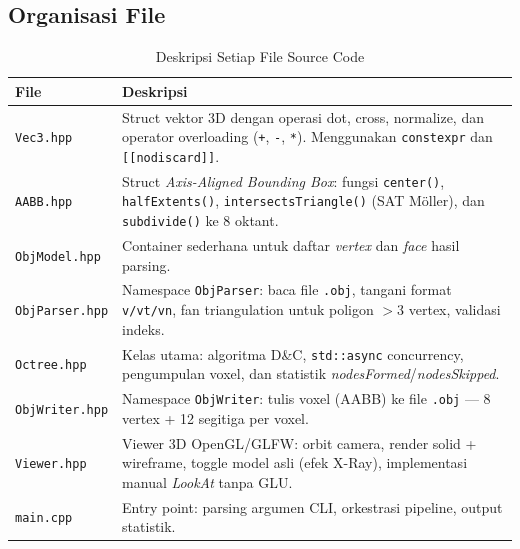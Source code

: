 \documentclass[12pt, a4paper]{report}
\begin{document}
\subsection{Organisasi File}

\begin{table}[H]
  \centering
  \caption{Deskripsi Setiap File Source Code}
  \label{tab:files}
  \begin{tabularx}{\textwidth}{lX}
    \toprule
    \textbf{File} & \textbf{Deskripsi} \\
    \midrule
    \texttt{Vec3.hpp}
      & Struct vektor 3D dengan operasi dot, cross, normalize,
        dan operator overloading (\texttt{+}, \texttt{-}, \texttt{*}).
        Menggunakan \texttt{constexpr} dan \texttt{[[nodiscard]]}. \\[4pt]

    \texttt{AABB.hpp}
      & Struct \textit{Axis-Aligned Bounding Box}: fungsi
        \texttt{center()}, \texttt{halfExtents()},
        \texttt{intersectsTriangle()} (SAT Möller), dan
        \texttt{subdivide()} ke 8 oktant. \\[4pt]

    \texttt{ObjModel.hpp}
      & Container sederhana untuk daftar \textit{vertex} dan
        \textit{face} hasil parsing. \\[4pt]

    \texttt{ObjParser.hpp}
      & Namespace \texttt{ObjParser}: baca file \texttt{.obj},
        tangani format \texttt{v/vt/vn}, fan triangulation
        untuk poligon $>3$ vertex, validasi indeks. \\[4pt]

    \texttt{Octree.hpp}
      & Kelas utama: algoritma D\&C, \texttt{std::async}
        concurrency, pengumpulan voxel, dan statistik
        \textit{nodesFormed}/\textit{nodesSkipped}. \\[4pt]

    \texttt{ObjWriter.hpp}
      & Namespace \texttt{ObjWriter}: tulis voxel (AABB) ke
        file \texttt{.obj} — 8 vertex + 12 segitiga per voxel. \\[4pt]

    \texttt{Viewer.hpp}
      & Viewer 3D OpenGL/GLFW: orbit camera, render solid
        + wireframe, toggle model asli (efek X-Ray),
        implementasi manual \textit{LookAt} tanpa GLU. \\[4pt]

    \texttt{main.cpp}
      & Entry point: parsing argumen CLI,
        orkestrasi pipeline, output statistik. \\
    \bottomrule
  \end{tabularx}
\end{table}
\end{document}
